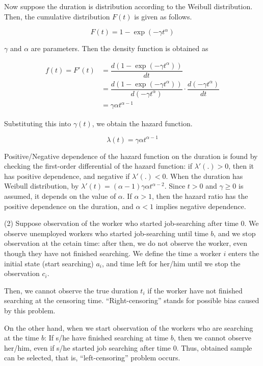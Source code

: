 \documentclass[dvipdfmx, 12pt]{article}
\begin{document}
Now suppose the duration is distribution according to the Weibull distribution. Then, the cumulative distribution $F(t)$ is given as follows.

\[
F(t) = 1 - \exp (- \gamma t^{\alpha})
\]

$\gamma$ and $\alpha$ are parameters. Then the density function is obtained as

\begin{align*}
  f(t) = F'(t) & = \dfrac{d (1 - \exp (- \gamma t^{\alpha}))}{dt} \\
  &= \dfrac{d (1 - \exp (- \gamma t^{\alpha}))}{d (- \gamma t^{\alpha})} \cdot \dfrac{d (- \gamma t^{\alpha})}{d t} \\
  & = \gamma \alpha t^{\alpha - 1}
\end{align*}

Substituting this into $\gamma(t)$, we obtain the hazard function.

\[
\lambda(t) = \gamma \alpha t^{\alpha - 1}
\]

Positive/Negative dependence of the hazard function on the duration is found by checking the first-order differential of the hazard function: if $\lambda' (.) > 0$, then it has positive dependence, and negative if $\lambda'(.) < 0$. When the duration has Weibull distribution, by $\lambda'(t) = (\alpha - 1) \gamma \alpha t^{\alpha - 2}$. Since $t > 0$ and $\gamma \geq 0$ is assumed, it depends on the value of $\alpha$. If $\alpha > 1$, then the hazard ratio has the positive dependence on the duration, and $\alpha < 1$ implies negative dependence.

\vspace{1zw}

(2) Suppose observation of the worker who started job-searching after time 0. We observe unemployed workers who started job-searching until time $b$, and we stop observation at the cetain time: after then, we do not observe the worker, even though they have not finished searching. We define the time a worker $i$ enters the initial state (start searching) $a_i$, and time left for her/him until we stop the observation $c_i$.

Then, we cannot observe the true duration $t_i$ if the worker have not finished searching at the censoring time. ``Right-censoring'' stands for possible bias caused by this problem.

On the other hand, when we start observation of the workers who are searching at the time $b$: If s/he have finished searching at time $b$, then we cannot observe her/him, even if s/he started job searching after time $0$. Thus, obtained sample can be selected, that is, ``left-censoring'' problem occurs.
\end{document}
